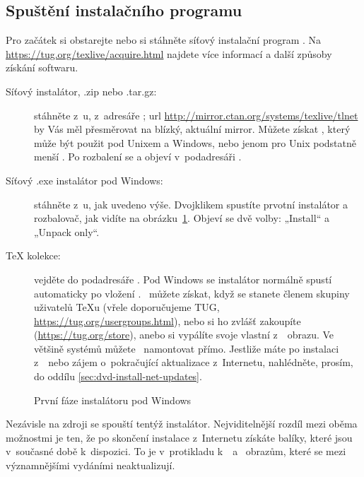 \documentclass[\classoptions,slovak,english,czech]{\classname}
\newcommand{\CSTUG}{\CS TUG}
\begin{document}
\subsection{Spuštění instalačního programu}
\label{sec:inst.start}

Pro začátek si obstarejte \TK{} \DVD{} nebo si stáhněte
síťový instalační program \TL{}.
Na \url{https://tug.org/texlive/acquire.html}
najdete více informací a další způsoby získání softwaru.

\begin{description}
\item [Síťový instalátor, .zip nebo .tar.gz:] stáhněte z~\CTAN{}u, 
z~adresáře ; url
\url{http://mirror.ctan.org/systems/texlive/tlnet}
by Vás měl přesměrovat na blízký, aktuální mirror.
Můžete získat , který může
být použit pod Unixem a Windows, nebo jenom pro Unix
podstatně menší .
Po rozbalení se  a
 objeví v~podadresáři .

\item[Síťový .exe instalátor pod Windows:] stáhněte z~\CTAN{}u,
jak uvedeno výše. Dvojklikem spustíte prvotní 
instalátor a rozbalovač, jak vidíte na 
obrázku~\ref{fig:nsis}. Objeví se dvě volby:
„Install“ a „Unpack only“.

\item [\DVD{} \TeX{} kolekce:] vejděte do podadresáře \DVD{} . 
Pod Windows se instalátor normálně spustí %
automaticky po vložení \DVD. \DVD\ můžete získat, když se stanete členem 
skupiny uživatelů \TeX u (vřele doporučujeme \CSTUG,
\url{https://tug.org/usergroups.html}), nebo si ho zvlášť zakoupíte
(\url{https://tug.org/store}), anebo si vypálíte svoje vlastní z~\ISO\
obrazu. %
Ve většině systémů můžete \ISO\ namontovat přímo. 
Jestliže máte po instalaci z~\DVD\ nebo \ISO{} 
zájem o~pokračující aktualizace z~Internetu, 
nahlédněte, prosím, do oddílu \ref{sec:dvd-install-net-updates}.
\end{description}

\begin{figure}[tb]
\centering{}
\caption{První fáze  instalátoru pod Windows}\label{fig:nsis}
\end{figure}

Nezávisle na zdroji se spouští tentýž instalátor. Nejviditelnější
rozdíl mezi oběma možnostmi je ten, že po skončení
instalace z~Internetu získáte balíky, které jsou v~současné 
době k~dispozici. To je v~protikladu k~\DVD\ a 
\ISO\ obrazům, které se mezi významnějšími vydáními neaktualizují.
\end{document}
